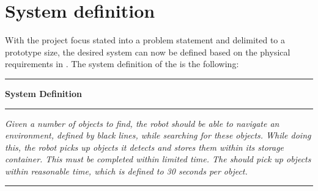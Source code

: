 \section{System definition} \label{sec:system_definition}

With the project focus stated into a problem statement and delimited to a prototype size, the desired system can now be defined based on the physical requirements in . The system definition of the \projname{} is the following:

\begin{table}[H]
	\centering
	\begin{narrow}{1cm}{1cm}

	\rule{\linewidth}{0.035cm}
	\begin{center}
	\textbf{System Definition} 
	\end{center}
	\rule{\linewidth}{0.035cm}
    
	\medskip\noindent \textit{Given a number of objects to find, the robot should be able to navigate an environment, defined by black lines, while searching for these objects. While doing this, the robot picks up objects it detects and stores them within its storage container. This must be completed within limited time. The \projname{} should pick up objects within reasonable time, which is defined to 30 seconds per object.}

	\rule{\linewidth}{0.035cm}
    \label{sec:systemdefinition}
	\end{narrow}
\end{table}

